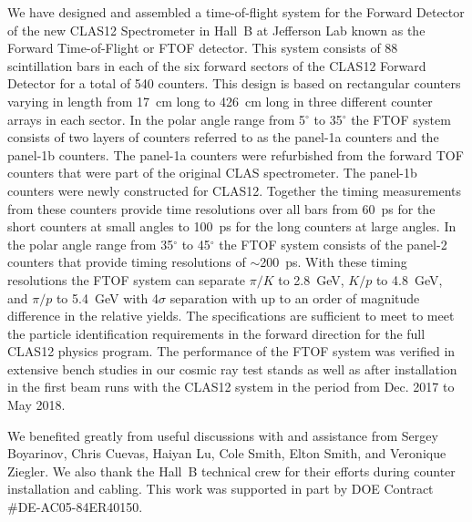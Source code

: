 \documentclass{elsart}
\begin{document}
We have designed and assembled a time-of-flight system for the Forward Detector of the new CLAS12
Spectrometer in Hall~B at Jefferson Lab known as the Forward Time-of-Flight or FTOF detector. This
system consists of 88 scintillation bars in each of the six forward sectors of the CLAS12 Forward Detector
for a total of 540 counters. This design is based on rectangular counters varying in length from 17~cm long
to 426~cm long in three different counter arrays in each sector. In the polar angle range from 5$^\circ$ to
35$^\circ$ the FTOF system consists of two layers of counters referred to as the panel-1a counters and the
panel-1b counters. The panel-1a counters were refurbished from the forward TOF counters that were part
of the original CLAS spectrometer. The panel-1b counters were newly constructed for CLAS12. Together the
timing measurements from these counters provide time resolutions over all bars from 60~ps for the short
counters at small angles to 100~ps for the long counters at large angles. In the polar angle range from
35$^\circ$ to 45$^\circ$ the FTOF system consists of the panel-2 counters that provide timing resolutions
of $\sim$200~ps. With these timing resolutions the FTOF system can separate $\pi/K$ to 2.8~GeV, $K/p$
to 4.8~GeV, and $\pi/p$ to 5.4~GeV with 4$\sigma$ separation with up to an order of magnitude difference
in the relative yields.  The specifications are sufficient to meet to meet the particle identification requirements
in the forward direction for the full CLAS12 physics program. The performance of the FTOF system was
verified in extensive bench studies in our cosmic ray test stands as well as after installation in the first beam
runs with the CLAS12 system in the period from Dec. 2017 to May 2018. 

\ack

We benefited greatly from useful discussions with and assistance from Sergey Boyarinov, Chris Cuevas,
Haiyan Lu, Cole Smith, Elton Smith, and Veronique Ziegler. We also thank the Hall~B technical crew for their
efforts during counter installation and cabling. This work was supported in part by DOE Contract
\#DE-AC05-84ER40150.

\newpage
\end{document}
